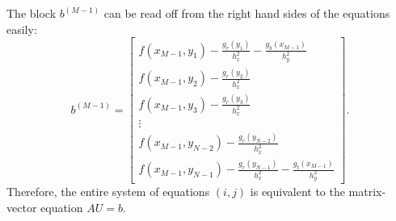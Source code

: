 \documentclass{homework}
\begin{document}
\begin{alphaparts}
\begin{equation*}
		\end{equation*}
		The block $b^{(M-1)}$ can be read off from the right hand sides of the equations easily:
		\begin{equation*}
			b^{(M-1)} = \left[\begin{matrix}
				f(x_{M-1},y_1) - \frac{g_r(y_1)}{h_x^2} - \frac{g_b(x_{M-1})}{h_y^2} \\
				f(x_{M-1},y_2) - \frac{g_r(y_2)}{h_x^2} \\
				f(x_{M-1},y_3) - \frac{g_r(y_3)}{h_x^2} \\
				\vdots \\
				f(x_{M-1},y_{N-2}) - \frac{g_r(y_{N-2})}{h_x^2}\\
				f(x_{M-1},y_{N-1}) - \frac{g_r(y_{N-1})}{h_x^2} - \frac{g_t(x_{M-1})}{h_y^2}
			\end{matrix}\right].
		\end{equation*}
		Therefore, the entire system of equations $(i,j)$ is equivalent to the matrix-vector equation $AU = b$.
	\end{alphaparts}
	
\end{document}
